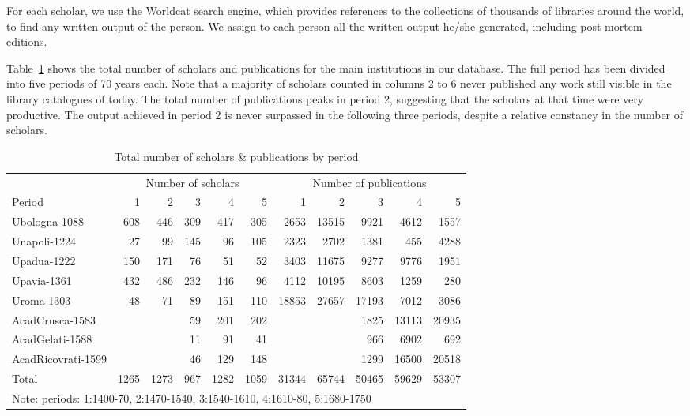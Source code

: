 \documentclass[12pt]{article}
\begin{document}
For each scholar, we use the Worldcat search engine, which provides references to  the collections of thousands of libraries around the world, to find any written output of the person. We assign to each person all the written output he/she generated, including post mortem editions.

Table~\ref{tab:publi} shows the total number of scholars and publications for the main institutions in our database. The full period has been divided into five periods of 70 years each. Note that a majority of scholars counted in columns 2 to 6 never published any work still visible in the library catalogues of today.   The total number of publications peaks in period 2, suggesting that the scholars at that time were very productive. The output achieved in period 2 is never surpassed in the following three periods, despite a relative constancy in the number of scholars.


\begin{table}[htbp]
{\small
\begin{tabular}{lrrrrrrrrrr}
\hline
\hline
            & \multicolumn{5}{c}{Number of scholars}  & \multicolumn{5}{c}{Number of publications}\\
Period   & 1 &2 & 3 & 4 & 5  & 1 &2 & 3 & 4 & 5\\
\hline
{Ubologna-1088}      & 608   & 446   & 309   & 417   & 305   & 2653  & 13515 & 9921  & 4612  & 1557 \\
{Unapoli-1224}       & 27    & 99    & 145   & 96    & 105   & 2323  & 2702  & 1381  & 455   & 4288 \\
{Upadua-1222}        & 150   & 171   & 76    & 51    & 52    & 3403  & 11675 & 9277  & 9776  & 1951 \\
{Upavia-1361}        & 432   & 486   & 232   & 146   & 96    & 4112  & 10195 & 8603  & 1259  & 280 \\
{Uroma-1303}         & 48    & 71    & 89    & 151   & 110   & 18853 & 27657 & 17193 & 7012  & 3086 \\
{AcadCrusca-1583}    &       &       & 59    & 201   & 202   &       &       & 1825  & 13113 & 20935 \\
{AcadGelati-1588}    &       &       & 11    & 91    & 41    &       &       & 966   & 6902  & 692 \\
{AcadRicovrati-1599} &       &       & 46    & 129   & 148   &       &       & 1299  & 16500 & 20518 \\
\hline
  Total    & 1265  & 1273  & 967   & 1282  & 1059  & 31344 & 65744 & 50465 & 59629 & 53307 \\
\hline
\hline
 \multicolumn{11}{l}{Note: periods: 1:1400-70, 2:1470-1540, 3:1540-1610, 4:1610-80, 5:1680-1750}
\end{tabular}}
\caption{Total number of scholars \& publications by period}\label{tab:publi}
\end{table}
\end{document}
